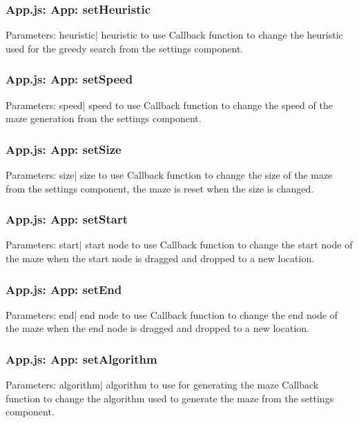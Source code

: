 \documentclass[titlepage]{article}
\begin{document}
\subsubsection{App.js: App: setHeuristic}
Parameters:\newline
\indent heuristic| heuristic to use\newline
Callback function to change the heuristic used for the greedy search from the settings component.

\subsubsection{App.js: App: setSpeed}
Parameters:\newline
\indent speed| speed to use\newline
Callback function to change the speed of the maze generation from the settings component.

\subsubsection{App.js: App: setSize}
Parameters:\newline
\indent size| size to use\newline
Callback function to change the size of the maze from the settings component, the maze is reset when the size is changed.

\subsubsection{App.js: App: setStart}
Parameters:\newline
\indent start| start node to use\newline
Callback function to change the start node of the maze when the start node is dragged and dropped to a new location.

\subsubsection{App.js: App: setEnd}
Parameters:\newline
\indent end| end node to use\newline
Callback function to change the end node of the maze when the end node is dragged and dropped to a new location.

\subsubsection{App.js: App: setAlgorithm}
Parameters:\newline
\indent algorithm| algorithm to use for generating the maze\newline
Callback function to change the algorithm used to generate the maze from the settings component.
\end{document}
